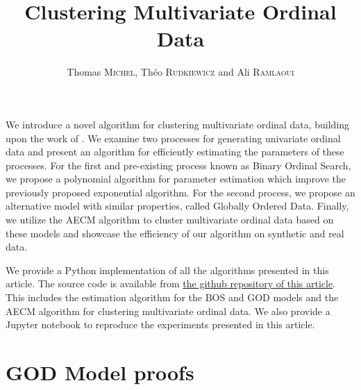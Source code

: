 \documentclass{ipol}
\title{Clustering Multivariate Ordinal Data}
\author{Thomas \textsc{Michel}, Théo \textsc{Rudkiewicz} and Ali \textsc{Ramlaoui}}
\begin{document}
\tableofcontents

\begin{ipolAbstract}
    We introduce a novel algorithm for clustering multivariate ordinal data, building upon the work of \cite{biernacki2016model}. We examine two processes for generating univariate ordinal data and present an algorithm for efficiently estimating the parameters of these processes. For the first and pre-existing process known as Binary Ordinal Search, we propose a polynomial algorithm for parameter estimation which improve the previously proposed exponential algorithm. For the second process, we propose an alternative model with similar properties, called Globally Ordered Data. Finally, we utilize the AECM algorithm to cluster multivariate ordinal data based on these models and showcase the efficiency of our algorithm on synthetic and real data.
\end{ipolAbstract}

\begin{ipolCode}
    We provide a Python implementation of all the algorithms presented in this article. The source code is available from \href{https://github.com/Thomick/Ordinal-data-clustering}{the github repository of this article}. This includes the estimation algorithm for the BOS and GOD models and the AECM algorithm for clustering multivariate ordinal data.
    We also provide a Jupyter notebook to reproduce the experiments presented in this article. 
\end{ipolCode}






















\appendix







\section{GOD Model proofs}
\label{appendix:god}




\end{document}
